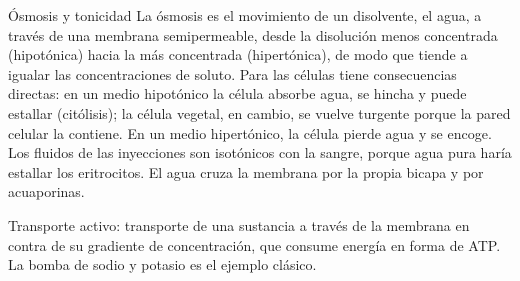 \documentclass{book}
\begin{document}
\begin{tcolorbox}[title={Definición}, studiumdef, breakable]

Ósmosis y tonicidad
La ósmosis es el movimiento de un disolvente, el agua, a través de una membrana semipermeable, desde la disolución menos concentrada (hipotónica) hacia la más concentrada (hipertónica), de modo que tiende a igualar las concentraciones de soluto. Para las células tiene consecuencias directas: en un medio hipotónico la célula absorbe agua, se hincha y puede estallar (citólisis); la célula vegetal, en cambio, se vuelve turgente porque la pared celular la contiene. En un medio hipertónico, la célula pierde agua y se encoge. Los fluidos de las inyecciones son isotónicos con la sangre, porque agua pura haría estallar los eritrocitos. El agua cruza la membrana por la propia bicapa y por acuaporinas.

\end{tcolorbox}

\begin{tcolorbox}[title={Definición}, studiumdef, breakable]

Transporte activo: transporte de una sustancia a través de la membrana en contra de su gradiente de concentración, que consume energía en forma de ATP. La bomba de sodio y potasio es el ejemplo clásico.

\end{tcolorbox}
\end{document}

